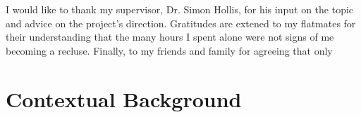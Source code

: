 \documentclass[ %
                    author={Luke Murray},
                supervisor={Dr. Simon Hollis},
                     title={Shadow Peer-to-Peer Networks},
                  subtitle={},
                    degree={MEng},
                      year={2013} ]{thesis}
\begin{document}
I would like to thank my supervisor, Dr. Simon Hollis, for his input on the topic and advice on the project's direction. Gratitudes are extened to my flatmates for their understanding that the many hours I spent alone were not signs of me becoming a recluse. Finally, to my friends and family for agreeing that only 


%

\mainmatter


\chapter{Contextual Background}
\label{chap:context}
\end{document}
